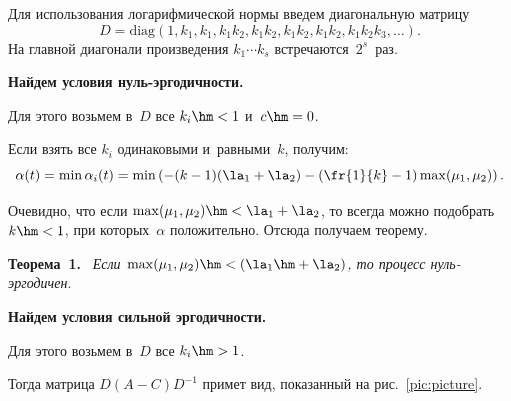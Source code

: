 Для использования логарифмической нормы введем диагональную матрицу 
$$
D=\mathrm{diag}\left(1,k_1,k_1,k_1 k_2,k_1 k_2, k_1 k_2, k_1 k_2, k_1 k_2 k_3, \ldots\right).
$$ 
На главной диагонали произведения $k_1  \cdots k_s$ встречаются~$2^s$~раз.

\textbf{Найдем условия нуль-эргодичности.}

Для этого возьмем в~$D$ все $k_i\hm<1$ и~$c\hm=0$.

Если взять все $k_i$ одинаковыми и~равными~$k$, получим:
\begin{equation*}
\alpha(t)=\min \alpha_i(t)=\min\left( - (k-1)(\la_1+\la_2)- 
\left(\fr {1}{k}-1\right)\max(\mu_1,\mu_2)\right).
\end{equation*}

Очевидно, что если $\max(\mu_1,\mu_2)\hm<\la_1+\la_2$, то всегда можно подобрать $k\hm<1$, при 
которых~$\alpha$ положительно.
%
Отсюда получаем теорему.

\smallskip

\noindent
\textbf{Теорема~1.}\ 
\textit{Если $\max(\mu_1,\mu_2)\hm<(\la_1\hm+\la_2)$, то процесс нуль-эр\-го\-дичен}.

\smallskip

\textbf{Найдем условия сильной эргодичности.}

Для этого возьмем в~$D$ все $k_i\hm>1$.


Тогда матрица $D(A-C)D^{-1}$ примет вид, показанный на рис.~\ref{pic:picture}.


